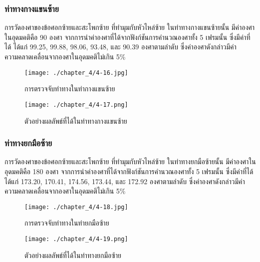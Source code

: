 \subsubsection{ท่าทางกางแขนซ้าย}
การวัดองศาของข้อศอกซ้ายและสะโพกซ้าย ที่ทำมุมกับหัวไหล่ซ้าย ในท่าทางกางแขนซ้ายนั้น มีค่าองศาในอุดมคติคือ 90 องศา จากการนำค่าองศาที่ได้จากฟังก์ชันการคำนวณองศาทั้ง 5 เฟรมนั้น ซึ่งมีค่าที่ได้ ได้แก่ 99.25, 99.88, 98.06, 93.48, และ 90.39 องศาตามลำดับ ซึ่งค่าองศาดังกล่าวมีค่าความคลาดเคลื่อนจากองศาในอุดมคติไม่เกิน 5\%
\begin{figure}
	\texttt{[image: ./chapter\_4/4-16.jpg]}
	\caption{การตรวจจับท่าทางในท่ากางแขนซ้าย}
\end{figure}
\begin{figure}
	\texttt{[image: ./chapter\_4/4-17.png]}
	\caption{ตัวอย่างผลลัพธ์ที่ได้ในท่าทางกางแขนซ้าย}
\end{figure}
\subsubsection{ท่าทางยกมือซ้าย}
การวัดองศาของข้อศอกซ้ายและสะโพกซ้าย ที่ทำมุมกับหัวไหล่ซ้าย ในท่าทางยกมือซ้ายนั้น มีค่าองศาในอุดมคติคือ 180 องศา จากการนำค่าองศาที่ได้จากฟังก์ชันการคำนวณองศาทั้ง 5 เฟรมนั้น ซึ่งมีค่าที่ได้ ได้แก่ 173.20, 170.41, 174.56, 173.44, และ 172.92 องศาตามลำดับ ซึ่งค่าองศาดังกล่าวมีค่าความคลาดเคลื่อนจากองศาในอุดมคติไม่เกิน 5\%
\begin{figure}
	\texttt{[image: ./chapter\_4/4-18.jpg]}
	\caption{การตรวจจับท่าทางในท่ายกมือซ้าย}
\end{figure}
\begin{figure}
	\texttt{[image: ./chapter\_4/4-19.png]}
	\caption{ตัวอย่างผลลัพธ์ที่ได้ในท่าทางยกมือซ้าย}
\end{figure}

